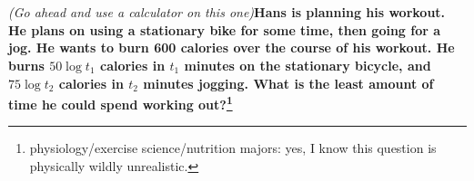 \documentclass[english]{article}
\newcommand{\prob}[1]{\setcounter{section}{#1-1}\section{}}
\theoremstyle{remark}
\theoremstyle{definition}
\begin{document}
	\prob{11} \emph{(Go ahead and use a calculator on this one\textellipsis)}\newline\textbf{Hans is planning his workout. He plans on using a stationary bike for some time, then going for a jog. He wants to burn 600 calories over the course of his workout. He burns $50\log t_1$ calories in $t_1$ minutes on the stationary bicycle, and $75\log t_2$ calories in $t_2$ minutes jogging. What is the least amount of time he could spend working out?\footnote{physiology/exercise science/nutrition majors: yes, I know this question is physically wildly unrealistic.}}
%	
\end{document}
